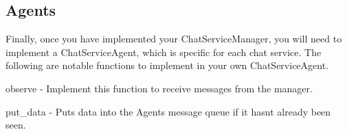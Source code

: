 \subsection*{Agents}

Finally, once you have implemented your {\ttfamily Chat\+Service\+Manager}, you will need to implement a {\ttfamily Chat\+Service\+Agent}, which is specific for each chat service. The following are notable functions to implement in your own {\ttfamily Chat\+Service\+Agent}.


\begin{DoxyEnumerate}
\item {\ttfamily observe} -\/ Implement this function to receive messages from the manager.
\item {\ttfamily put\+\_\+data} -\/ Puts data into the Agent\textquotesingle{}s message queue if it hasn\textquotesingle{}t already been seen. 
\end{DoxyEnumerate}
